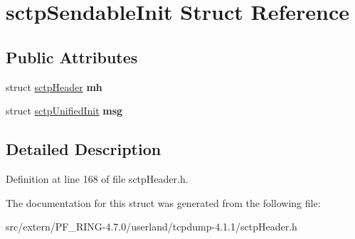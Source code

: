 \hypertarget{structsctp_sendable_init}{
\section{sctpSendableInit Struct Reference}
\label{structsctp_sendable_init}
}
\subsection*{Public Attributes}
\begin{DoxyCompactItemize}
\item 
\hypertarget{structsctp_sendable_init_a93ba2055999ff65fe61cb8c1cc004ce6}{
struct \hyperlink{structsctp_header}{sctpHeader} {\bfseries mh}}
\label{structsctp_sendable_init_a93ba2055999ff65fe61cb8c1cc004ce6}

\item 
\hypertarget{structsctp_sendable_init_ad1139c6a208f0d745bb5fd49d1884568}{
struct \hyperlink{structsctp_unified_init}{sctpUnifiedInit} {\bfseries msg}}
\label{structsctp_sendable_init_ad1139c6a208f0d745bb5fd49d1884568}

\end{DoxyCompactItemize}


\subsection{Detailed Description}


Definition at line 168 of file sctpHeader.h.



The documentation for this struct was generated from the following file:\begin{DoxyCompactItemize}
\item 
src/extern/PF\_\-RING-\/4.7.0/userland/tcpdump-\/4.1.1/sctpHeader.h\end{DoxyCompactItemize}
